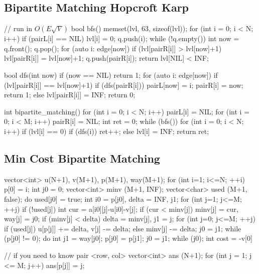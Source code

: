 \subsection{Bipartite Matching Hopcroft Karp}
\begin{cppcode}
	// run in $O(E\sqrt{V})$
	bool bfs() {
		memset(lvl, 63, sizeof(lvl));
		for (int i = 0; i < N; i++) {
				if (pairL[i] == NIL) {
						lvl[i] = 0;
						q.push(i); }}
		while (!q.empty()) {
				int now = q.front(); q.pop();
				for (auto i: edge[now]) {
						if (lvl[pairR[i]] > lvl[now]+1) {
								lvl[pairR[i]] = lvl[now]+1;
								q.push(pairR[i]);
		}}}
		return lvl[NIL] < INF;
	}

	bool dfs(int now) {
		if (now == NIL) return 1;
		for (auto i: edge[now]) {
				if (lvl[pairR[i]] == lvl[now]+1) {
						if (dfs(pairR[i])) {
								pairL[now] = i;
								pairR[i] = now;
								return 1;
							} else lvl[pairR[i]] = INF;
		}}
		return 0;
	}

	int bipartite_matching() {
		for (int i = 0; i < N; i++) pairL[i] = NIL;
		for (int i = 0; i < M; i++) pairR[i] = NIL;
		int ret = 0;
		while (bfs()) {
				for (int i = 0; i < N; i++) {
						if (lvl[i] == 0) {
								if (dfs(i)) ret++;
								else lvl[i] = INF;
		}}}
		return ret;
	}
\end{cppcode}

\subsection{Min Cost Bipartite Matching}
\begin{cppcode}
	vector<int> u(N+1), v(M+1), p(M+1), way(M+1);
	for (int i=1; i<=N; ++i) {
		p[0] = i;
		int j0 = 0;
		vector<int> minv (M+1, INF);
		vector<char> used (M+1, false);
		do {
			used[j0] = true;
			int i0 = p[j0],  delta = INF,  j1;
			for (int j=1; j<=M; ++j) {
				if (!used[j]) {
					int cur = a[i0][j]-u[i0]-v[j];
					if (cur < minv[j]) minv[j] = cur,  way[j] = j0;
					if (minv[j] < delta) delta = minv[j],  j1 = j;
				}
			}
			for (int j=0; j<=M; ++j) {
				if (used[j]) u[p[j]] += delta,  v[j] -= delta;
				else minv[j] -= delta;
			}
			j0 = j1;
		} while (p[j0] != 0);
		do {
			int j1 = way[j0];
			p[j0] = p[j1];
			j0 = j1;
		} while (j0);
	}
	int cost = -v[0]

	// if you need to know pair <row, col>
	vector<int> ans (N+1);
	for (int j = 1; j <= M; j++) ans[p[j]] = j;
\end{cppcode}